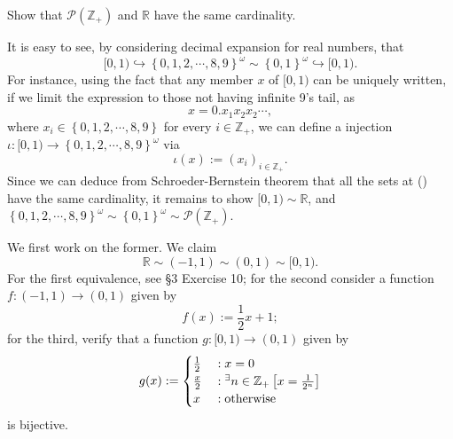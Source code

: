 \documentclass[a4paper,12pt]{article}
\begin{document}
\begin{exe}
	Show that \( \mathcal{P}(\mathcal{\mathbb{Z}_{+}}) \) and \( \mathbb{R} \) have the same cardinality.
\end{exe}
\begin{sol}
	It is easy to see, by considering decimal expansion for real numbers, that
	\begin{equation}\label{preeq:RandPZ}
		[0,1)
		\hookrightarrow
		\left\{ 0,1,2,\cdots,8,9 \right\}^{\omega}
		\sim
		\left\{ 0,1 \right\}^{\omega}
		\hookrightarrow
		[0,1).
	\end{equation}
	For instance, using the fact that any member \( x \) of \( [0,1) \) can be uniquely written, if we limit the expression to those not having infinite 9's tail, as
	\begin{equation*}
		x = 0. x_1 x_2 x_2 \cdots,
	\end{equation*}
	where \( x_i \in \left\{ 0,1,2,\cdots,8,9 \right\} \)
	for every \( i \in \mathbb{Z}_{+} \),
	we can define a injection
	\( \iota:[0,1) \to \left\{ 0,1,2,\cdots,8,9 \right\}^{\omega}\)
	via
	\begin{equation*}
		\iota (x) := (x_i)_{ i \in \mathbb{Z}_{+}}.
	\end{equation*}
	Since we can deduce from Schroeder-Bernstein theorem that
	all the sets at () have the same cardinality,
	it remains to show
	\( [0,1) \sim \mathbb{R} \),
	and 
	\( \left\{ 0,1,2,\cdots,8,9 \right\}^{\omega}
	\sim
	\left\{ 0,1 \right\}^{\omega}
	\sim
	\mathcal{P}(\mathbb{Z}_{+}) \).
	
	We first work on the former.
	We claim
	\begin{equation*}
		\mathbb{R}
		\sim
		(-1,1)
		\sim
		(0,1)
		\sim
		[0,1).
	\end{equation*}
	For the first equivalence, see \S3 Exercise 10;
	for  the second consider a function \( f:(-1,1)\to(0,1) \) given by
	\begin{equation*}
		f(x):=\frac{1}{2}x +1;
	\end{equation*}
	for the third, verify that a function
	\( g:[0,1)\to (0,1) \) 
	given by
	\begin{equation*}
		g(x):=\begin{cases}
			\frac{1}{2} & \;\mathrm{:}\; x= 0                                                       \\
			\frac{x}{2} & \;\mathrm{:}\; {}^{\exists}n\in \mathbb{Z}_{+}\left[ x=\frac{1}{2^n} \right] \\
			x           & \;\mathrm{:}\; \text{otherwise}
		\end{cases}
	\end{equation*}
	is bijective.
	

\end{sol}
\end{document}
